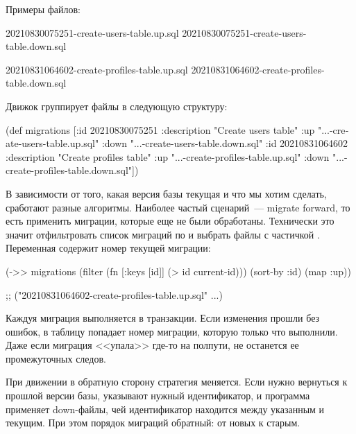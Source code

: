 Примеры файлов:

\begin{english}
  \begin{text}
20210830075251-create-users-table.up.sql
20210830075251-create-users-table.down.sql

20210831064602-create-profiles-table.up.sql
20210831064602-create-profiles-table.down.sql
  \end{text}
\end{english}

Движок группирует файлы в следующую структуру:

\begin{english}
  \begin{clojure}
(def migrations
  [{:id 20210830075251
    :description "Create users table"
    :up "...-create-users-table.up.sql"
    :down "...-create-users-table.down.sql"}
   {:id 20210831064602
    :description "Create profiles table"
    :up "...-create-profiles-table.up.sql"
    :down "...-create-profiles-table.down.sql"}])
  \end{clojure}
\end{english}

В зависимости от того, какая версия базы текущая и что мы хотим сделать, сработают разные алгоритмы. Наиболее частый сценарий~--- migrate forward, то есть применить миграции, которые еще не были обработаны. Технически это значит отфильтровать список миграций по  и выбрать файлы с частичкой . Переменная   содержит номер текущей миграции:

\begin{english}
  \begin{clojure/lines}
(->> migrations
     (filter (fn [{:keys [id]}]
               (> id current-id)))
     (sort-by :id)
     (map :up))

;; ("20210831064602-create-profiles-table.up.sql" ...)
  \end{clojure/lines}
\end{english}

Каждуя миграция выполняется в транзакции. Если изменения прошли без ошибок, в таблицу  попадает номер миграции, которую только что выполнили. Даже если миграция <<упала>> где-то на полпути, не останется ее промежуточных следов.

При движении в обратную сторону стратегия меняется. Если нужно вернуться к прошлой версии базы, указывают нужный идентификатор, и программа применяет down-файлы, чей идентификатор находится между указанным и текущим. При этом порядок миграций обратный: от новых к старым.

